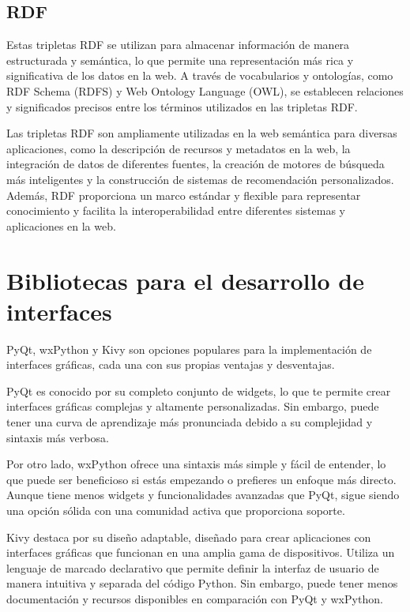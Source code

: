 \subsection{RDF}


Estas tripletas RDF se utilizan para almacenar información de manera estructurada y semántica, lo que permite una representación más rica y significativa de los datos en la web. A través de vocabularios y ontologías, como RDF Schema (RDFS) y Web Ontology Language (OWL), se establecen relaciones y significados precisos entre los términos utilizados en las tripletas RDF.

Las tripletas RDF son ampliamente utilizadas en la web semántica para diversas aplicaciones, como la descripción de recursos y metadatos en la web, la integración de datos de diferentes fuentes, la creación de motores de búsqueda más inteligentes y la construcción de sistemas de recomendación personalizados. Además, RDF proporciona un marco estándar y flexible para representar conocimiento y facilita la interoperabilidad entre diferentes sistemas y aplicaciones en la web.

\section{Bibliotecas para el desarrollo de interfaces}

PyQt, wxPython y Kivy son opciones populares para la implementación de interfaces gráficas, cada una con sus propias ventajas y desventajas.

PyQt es conocido por su completo conjunto de widgets, lo que te permite crear interfaces gráficas complejas y altamente personalizadas. Sin embargo, puede tener una curva de aprendizaje más pronunciada debido a su complejidad y sintaxis más verbosa.

Por otro lado, wxPython ofrece una sintaxis más simple y fácil de entender, lo que puede ser beneficioso si estás empezando o prefieres un enfoque más directo. Aunque tiene menos widgets y funcionalidades avanzadas que PyQt, sigue siendo una opción sólida con una comunidad activa que proporciona soporte.

Kivy destaca por su diseño adaptable, diseñado para crear aplicaciones con interfaces gráficas que funcionan en una amplia gama de dispositivos. Utiliza un lenguaje de marcado declarativo que permite definir la interfaz de usuario de manera intuitiva y separada del código Python. Sin embargo, puede tener menos documentación y recursos disponibles en comparación con PyQt y wxPython.







